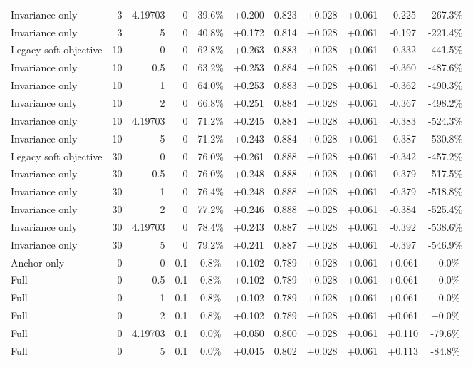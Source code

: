 \begin{table}[htbp]
\begin{tabular}{lrrrccccccc}
Invariance only & 3 & 4.19703 & 0 & 39.6\% & +0.200 & 0.823 & +0.028 & +0.061 & -0.225 & -267.3\% \\
Invariance only & 3 & 5 & 0 & 40.8\% & +0.172 & 0.814 & +0.028 & +0.061 & -0.197 & -221.4\% \\
Legacy soft objective & 10 & 0 & 0 & 62.8\% & +0.263 & 0.883 & +0.028 & +0.061 & -0.332 & -441.5\% \\
Invariance only & 10 & 0.5 & 0 & 63.2\% & +0.253 & 0.884 & +0.028 & +0.061 & -0.360 & -487.6\% \\
Invariance only & 10 & 1 & 0 & 64.0\% & +0.253 & 0.883 & +0.028 & +0.061 & -0.362 & -490.3\% \\
Invariance only & 10 & 2 & 0 & 66.8\% & +0.251 & 0.884 & +0.028 & +0.061 & -0.367 & -498.2\% \\
Invariance only & 10 & 4.19703 & 0 & 71.2\% & +0.245 & 0.884 & +0.028 & +0.061 & -0.383 & -524.3\% \\
Invariance only & 10 & 5 & 0 & 71.2\% & +0.243 & 0.884 & +0.028 & +0.061 & -0.387 & -530.8\% \\
Legacy soft objective & 30 & 0 & 0 & 76.0\% & +0.261 & 0.888 & +0.028 & +0.061 & -0.342 & -457.2\% \\
Invariance only & 30 & 0.5 & 0 & 76.0\% & +0.248 & 0.888 & +0.028 & +0.061 & -0.379 & -517.5\% \\
Invariance only & 30 & 1 & 0 & 76.4\% & +0.248 & 0.888 & +0.028 & +0.061 & -0.379 & -518.8\% \\
Invariance only & 30 & 2 & 0 & 77.2\% & +0.246 & 0.888 & +0.028 & +0.061 & -0.384 & -525.4\% \\
Invariance only & 30 & 4.19703 & 0 & 78.4\% & +0.243 & 0.887 & +0.028 & +0.061 & -0.392 & -538.6\% \\
Invariance only & 30 & 5 & 0 & 79.2\% & +0.241 & 0.887 & +0.028 & +0.061 & -0.397 & -546.9\% \\
Anchor only & 0 & 0 & 0.1 & 0.8\% & +0.102 & 0.789 & +0.028 & +0.061 & +0.061 & +0.0\% \\
Full & 0 & 0.5 & 0.1 & 0.8\% & +0.102 & 0.789 & +0.028 & +0.061 & +0.061 & +0.0\% \\
Full & 0 & 1 & 0.1 & 0.8\% & +0.102 & 0.789 & +0.028 & +0.061 & +0.061 & +0.0\% \\
Full & 0 & 2 & 0.1 & 0.8\% & +0.102 & 0.789 & +0.028 & +0.061 & +0.061 & +0.0\% \\
Full & 0 & 4.19703 & 0.1 & 0.0\% & +0.050 & 0.800 & +0.028 & +0.061 & +0.110 & -79.6\% \\
Full & 0 & 5 & 0.1 & 0.0\% & +0.045 & 0.802 & +0.028 & +0.061 & +0.113 & -84.8\% \\

\end{tabular}
\end{table}

